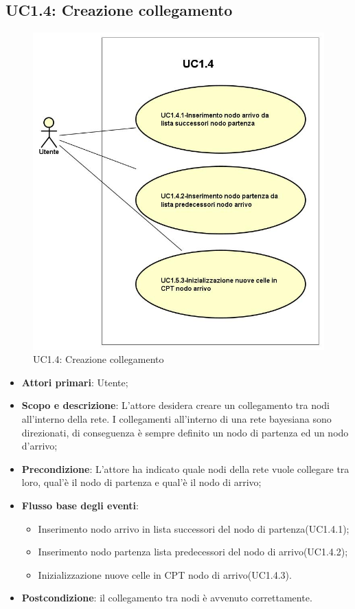 \subsection{UC1.4: Creazione collegamento} 
\hypertarget{UC1.4}{} 
\begin{figure} [H]
	\centering
	\includegraphics[scale=0.45]{Img/UC1-4} 
	\caption{UC1.4: Creazione collegamento} \label{} 
\end{figure} 
\begin{itemize} 
	\item{\textbf{Attori primari}: Utente;} 
	\item{\textbf{Scopo e descrizione}: L'attore desidera creare un collegamento tra nodi all'interno della rete. I collegamenti all'interno di una rete bayesiana sono direzionati, di conseguenza è sempre definito un nodo di partenza ed un nodo d'arrivo;} 
	\item{\textbf{Precondizione}: L'attore ha indicato quale nodi della rete vuole collegare tra loro, qual'è il nodo di partenza e qual'è il nodo di arrivo;} 
	\item{\textbf{Flusso base degli eventi}: } 
	\begin{itemize} 
		\item{Inserimento nodo arrivo in lista successori del nodo di partenza(UC1.4.1);} 
		\item{Inserimento nodo partenza lista predecessori del nodo di arrivo(UC1.4.2);} 
		\item{Inizializzazione nuove celle in CPT nodo di arrivo(UC1.4.3).} 
	\end{itemize} 
	\item{\textbf{Postcondizione}: il collegamento tra nodi è avvenuto correttamente.} 
\end{itemize} 
